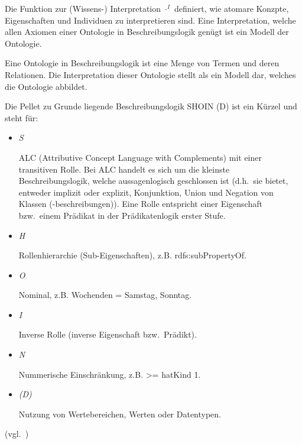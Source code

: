 Die Funktion zur (Wissens-) Interpretation $ \cdot^I $ definiert, wie atomare Konzpte, Eigenschaften und Individuen zu interpretieren sind. Eine Interpretation, welche allen Axiomen einer Ontologie in Beschreibungslogik genügt ist ein Modell der Ontologie.

Eine Ontologie in Beschreibungslogik ist eine Menge von Termen und deren Relationen. Die Interpretation dieser Ontologie stellt als ein Modell dar, welches die Ontologie abbildet.

Die Pellet zu Grunde liegende Beschreibungslogik SHOIN (D) ist ein Kürzel und steht für:
\begin{itemize}
\item \textit{S}

ALC (Attributive Concept Language with Complements) mit einer transitiven Rolle. Bei ALC handelt es sich um die kleinste Beschreibungslogik, welche aussagenlogisch geschlossen ist (d.h.\ sie bietet, entweder implizit oder explizit, Konjunktion, Union und Negation von Klassen (-beschreibungen)). Eine Rolle entspricht einer Eigenschaft bzw.\ einem Prädikat in der Prädikatenlogik erster Stufe.

\item \textit{H}

    Rollenhierarchie (Sub-Eigenschaften), z.B. rdfs:subPropertyOf.

\item \textit{O}

    Nominal, z.B. Wochenden = {Samstag, Sonntag}.


\item \textit{I}

    Inverse Rolle (inverse Eigenschaft bzw.\ Prädikt).

\item \textit{N}

    Nummerische Einschränkung, z.B. >= hatKind 1.

\item \textit{(D)}

    Nutzung von Wertebereichen, Werten oder Datentypen.
\end{itemize}

(vgl.~\cite{dl:baader2003})

